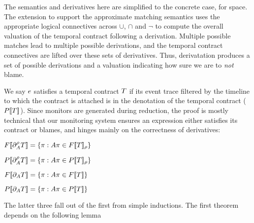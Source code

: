 The semantics and derivatives here are simplified to the concrete case, for space.
%
The extension to support the approximate matching semantics uses the appropriate logical connectives across $\cup$, $\cap$ and $\neg$ to compute the overall valuation of the temporal contract following a derivation.
%
Multiple possible matches lead to multiple possible derivations, and the temporal contract connectives are lifted over these sets of derivatives.
%
Thus, derivatation produces a set of possible derivations and a valuation indicating how sure we are to \emph{not} blame.

We say $e$ satisfies a temporal contract $T$ if its event trace filtered by the timeline to which the contract is attached is in the denotation of the temporal contract ($P[\![ T ]\!]$).
%
Since monitors are generated during reduction, the proof is mostly technical that our monitoring system ensures an expression either satisfies its contract or blames, and hinges mainly on the correctness of derivatives:
%

\begin{theorem}[Full]\label{thm:full}
 $F[\![ \partial_{A}^{\rho}{T} ]\!] = \left\{\pi : A\pi \in F[\![ T ]\!]_{\rho}\right\}$
\end{theorem}

\begin{theorem}[Partial]\label{thm:partial}
 $P[\![ \partial_{A}^{\rho}{T} ]\!] = \left\{\pi : A\pi \in P[\![ T ]\!]_{\rho}\right\}$
\end{theorem}

\begin{theorem}\label{thm:top-full}
 $F[\![ \partial_{A}{T} ]\!] = \left\{\pi : A\pi \in F[\![ T ]\!]\right\}$
\end{theorem}

\begin{theorem}\label{thm:top-partial}
 $P[\![ \partial_{A}{T} ]\!] = \left\{\pi : A\pi \in P[\![ T ]\!]\right\}$
\end{theorem}

The latter three fall out of the first from simple inductions.
%
The first theorem depends on the following lemma

